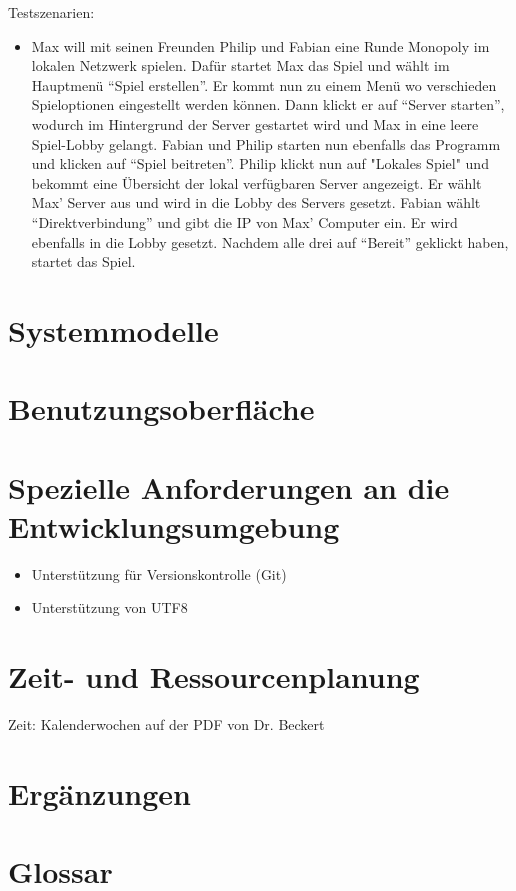 \documentclass[a4paper,10pt]{article}
\begin{document}
Testszenarien:
\begin{itemize}
\item Max will mit seinen Freunden Philip und Fabian eine Runde Monopoly im lokalen Netzwerk spielen. Dafür startet Max das Spiel und wählt im Hauptmenü ``Spiel erstellen''. Er kommt nun zu einem Menü wo verschieden Spieloptionen eingestellt werden können. Dann klickt er auf ``Server starten'', wodurch im Hintergrund der Server gestartet wird und Max in eine leere Spiel-Lobby gelangt. Fabian und Philip starten nun ebenfalls das Programm und klicken auf ``Spiel beitreten''. Philip klickt nun auf "Lokales Spiel" und bekommt eine Übersicht der lokal verfügbaren Server angezeigt. Er wählt Max' Server aus und wird in die Lobby des Servers gesetzt.
Fabian wählt ``Direktverbindung'' und gibt die IP von Max' Computer ein. Er wird ebenfalls in die Lobby gesetzt. Nachdem alle drei auf ``Bereit'' geklickt haben, startet das Spiel.
\end{itemize}
\section{Systemmodelle}
\section{Benutzungsoberfläche}
\section{Spezielle Anforderungen an die Entwicklungsumgebung}
\begin{itemize}
\item Unterstützung für Versionskontrolle (Git)
\item Unterstützung von UTF8
\end{itemize}
\section{Zeit- und Ressourcenplanung}
Zeit: Kalenderwochen auf der PDF von Dr. Beckert
\section{Ergänzungen}
\section{Glossar}
\end{document}
